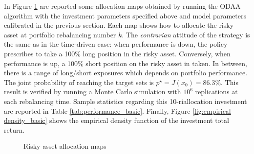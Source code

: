 In Figure \ref{fig:basic_maps} are reported some allocation maps obtained by running the \gls{ODAA} algorithm with the investment parameters specified above and model parameters calibrated in the previous section. Each map shows how to allocate the risky asset at portfolio rebalancing number $k$. The \textit{contrarian} attitude of the strategy is the same as in the time-driven case: when performance is down, the policy prescribes to take a 100\% long position in the risky asset. Conversely, when performance is up, a 100\% short position on the risky asset in taken. In between, there is a range of long/short exposures which depends on portfolio performance. The joint probability of reaching the target sets is $p^{\star} = J(x_0) = 86.3\%$. This result is verified by running a Monte Carlo simulation with $10^6$ replications at each rebalancing time. Sample statistics regarding this 10-riallocation investment are reported in Table \ref{tab:performance_basic}. Finally, Figure \ref{fig:empirical density_basic} shows the empirical density function of the investment total return.
\begin{figure}[h]
	\caption{Risky asset allocation maps}
	\label{fig:basic_maps}
\end{figure}

